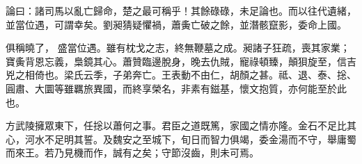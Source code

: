 \begin{pinyinscope}
 論曰：諸司馬以亂亡歸命，楚之最可稱乎！其餘碌碌，未足論也。而以往代遺緒，並當位遇，可謂幸矣。劉昶猜疑懼禍，蕭夤亡破之餘，並潛骸竄影，委命上國。



 俱稱曉了，
 盛當位遇。雖有枕戈之志，終無鞭墓之成。昶諸子狂疏，喪其家業；寶夤背恩忘義，梟鏡其心。蕭贊臨邊脫身，晚去仇賊，寵祿頓臻，顛狽旋至，信吉兇之相倚也。梁氏云季，子弟奔亡。王表動不由仁，胡顏之甚。祗、退、泰、捴、圓肅、大圜等雖羈旅異國，而終享榮名，非素有鎡基，懷文抱質，亦何能至於此也。



 方武陵擁眾東下，任捴以蕭何之事。君臣之道既篤，家國之情亦隆。金石不足比其心，河水不足明其誓。及魏安之至城下，旬日而智力俱竭，委金湯而不守，舉庸蜀而來王。若乃見機而作，誠有之矣；守節沒齒，則未可焉。



\end{pinyinscope}